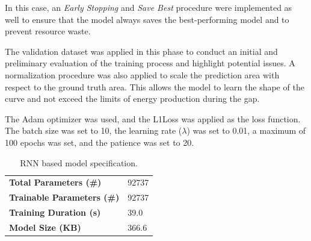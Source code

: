 In this case, an \textit{Early Stopping}\cite{es} and \textit{Save Best} procedure were implemented
as well to ensure that the model always saves the best-performing model and to prevent
resource waste.

The validation dataset was applied in this phase to conduct an initial
and preliminary evaluation of the training process and highlight potential issues.
A normalization procedure was also applied to scale the prediction area with respect
to the ground truth area.
This allows the model to learn the shape of the curve and not exceed the limits
of energy production during the gap.

The Adam\cite{adam} optimizer was used, and the L1Loss\cite{loss} was applied as the loss function.
The batch size was set to 10, the learning rate ($\lambda$) was set to 0.01,
a maximum of 100 epochs was set, and the patience was set to 20.


\begin{table}[H]
	\begin{center}
		\begin{tabular}[c]{l|l}
			\textbf{Total Parameters (\#)}     & 92737 \\
			\textbf{Trainable Parameters (\#)} & 92737 \\
			\textbf{Training Duration (s)}     & 39.0  \\
			\textbf{Model Size (KB)}           & 366.6
		\end{tabular}
	\end{center}
	\caption{RNN based model specification.}\label{tab:grrunspecs}
\end{table}

